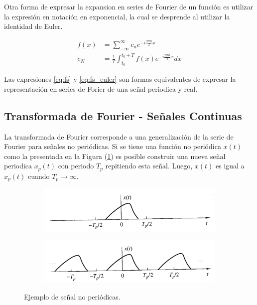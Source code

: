 \documentclass[
  letterpaper,
  twocolumn,
  9pt,
  journal,
  final]{IEEEtran}
\begin{document}
Otra forma de expresar la expansion en series de Fourier de un función es utilizar la expresión en notación en exponencial, la cual se desprende al utilizar la identidad de Euler.

\begin{align}
	f(x) &= \sum_{-\infty}^{\infty} c_n e ^ {-i \frac{2\pi n}{T} x} \label{eq:fs_euler}\\
	c_N &= \frac{1}{T} \int_{t_0}^{t_0 + T} f(x) e ^ {-i \frac{2\pi n}{T} x} dx
\end{align}

Las expresiones \ref{eq:fs} y \ref{eq:fs_euler} son formas equivalentes de expresar la representación en series de Forier de una señal periodica y real.

\subsection{Transformada de Fourier - Señales Continuas}

La transformada de Fourier corresponde a una generalización de la serie de Fourier para señales no periódicas.
Si se tiene una función no periódica $x(t)$ como la presentada en la Figura (\ref{fig:senal_aperidica}) es posible construir una nueva señal periodica $x_p(t)$ con periodo $T_p$ repitiendo esta señal. Luego, $x(t)$ es igual a $x_p(t)$ cuando $T_p \to \infty$.

\begin{figure}[h!]
\centering
	\begin{subfigure}[b]{\columnwidth}
	\includegraphics[width=1\linewidth, angle=-1]{imgs/proakis_aperiodic_1.png}
	\label{fig:senal_aperidica}
	\end{subfigure}

	\begin{subfigure}[b]{\columnwidth}
	\includegraphics[width=1\linewidth, angle=-1]{imgs/proakis_aperiodic_2.png}
	\label{fig:senal_aperidocia_repetida}
	\end{subfigure}

\caption{Ejemplo de señal no periódicas\cite{proakis}.}
\label{fig:p4_both}
\end{figure}
\end{document}
